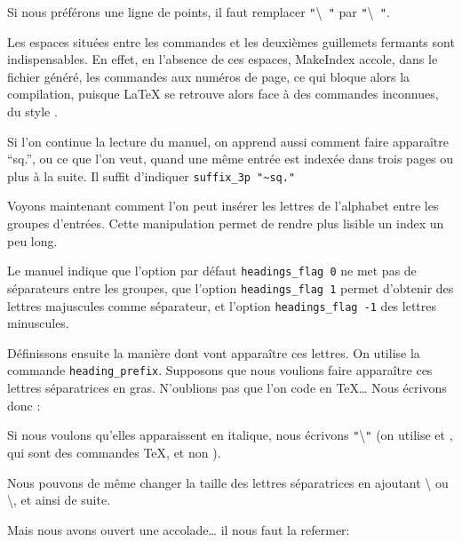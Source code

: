 Si nous préférons une ligne de points, il faut remplacer \verb|"|\textbackslash{}\verb| "| par \verb|"|\textbackslash{}\verb| "|.

\begin{attention}
Les espaces situées entre les commandes et les deuxièmes guillemets fermants sont indispensables. En effet, en l'absence de ces espaces, MakeIndex accole, dans le fichier  généré, les commandes aux numéros de page, ce qui bloque alors  la   compilation, puisque \LaTeX{} se retrouve alors face à des commandes inconnues, du style .
\end{attention}

Si l'on continue la lecture du manuel, on apprend aussi comment faire apparaître \enquote{sq.}, ou ce que l'on veut, quand une même entrée est indexée dans trois pages ou plus à la suite. Il suffit d'indiquer \verb+suffix_3p "~sq."+

Voyons maintenant comment l'on peut insérer les lettres de l'alphabet entre les groupes d'entrées. Cette manipulation permet de rendre plus lisible un index un peu long. 

Le manuel indique que l'option par défaut \verb+headings_flag 0+ ne met pas de séparateurs entre les groupes, que l'option \verb+headings_flag 1+ permet d'obtenir des lettres majuscules comme séparateur, et l'option  \verb+headings_flag -1+ des lettres minuscules.

Définissons ensuite la manière dont vont apparaître ces lettres. On utilise la commande \verb|heading_prefix|. Supposons que nous voulions faire apparaître ces lettres séparatrices en gras. N'oublions pas que l'on code en \TeX … Nous écrivons donc :

\begin{latexcode}
heading_prefix "{\\bfseries "
\end{latexcode} 

Si nous voulons qu'elles apparaissent en italique, nous écrivons \verb|"|\textbackslash{}\verb|"| (on utilise  et , qui sont des commandes \TeX, et non  ).

Nous  pouvons de même changer la taille des lettres séparatrices en ajoutant \textbackslash{} ou \textbackslash{}, et ainsi de suite. 

Mais nous avons ouvert une accolade… il nous faut la refermer:

\begin{latexcode}
heading_suffix " }\\nopagebreak\n " 
\end{latexcode}


